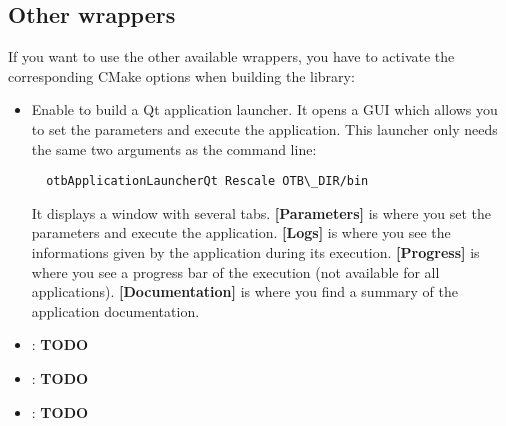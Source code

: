 \subsection{Other wrappers}\label{sec:wrappedAppliOtherWrap}
If you want to use the other available wrappers, you have to activate the corresponding CMake 
options when building the library:
\begin{itemize}
  \item Enable  to build a Qt application launcher. It opens a GUI which 
  allows you to set the parameters and execute the application. This launcher only needs 
  the same two arguments as the command line:
  \begin{verbatim}
  otbApplicationLauncherQt Rescale OTB\_DIR/bin
  \end{verbatim}
  It displays a window with several tabs. \textbf{[Parameters]} is where you set the parameters and execute the application.
  \textbf{[Logs]} is where you see the informations given by the application during its execution. \textbf{[Progress]} is 
  where you see a progress bar of the execution (not available for all applications). \textbf{[Documentation]} is where you
  find a summary of the application documentation.
   
  \item {} : \textbf{TODO}
  \item {} : \textbf{TODO}
  \item {} : \textbf{TODO}
\end{itemize}

